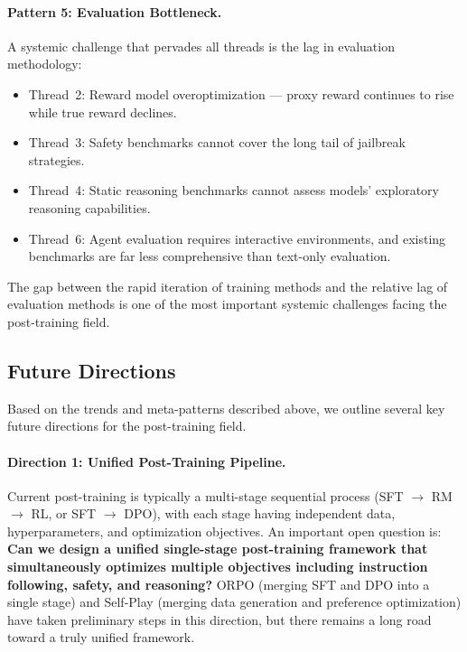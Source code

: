 \paragraph{Pattern 5: Evaluation Bottleneck.}
A systemic challenge that pervades all threads is the lag in evaluation methodology:
\begin{itemize}[leftmargin=2em]
  \item Thread~2: Reward model overoptimization ---
    proxy reward continues to rise while true reward declines.
  \item Thread~3: Safety benchmarks cannot cover the long tail of jailbreak strategies.
  \item Thread~4: Static reasoning benchmarks cannot assess models' exploratory reasoning capabilities.
  \item Thread~6: Agent evaluation requires interactive environments,
    and existing benchmarks are far less comprehensive than text-only evaluation.
\end{itemize}
The gap between the rapid iteration of training methods and the relative lag of evaluation methods
is one of the most important systemic challenges facing the post-training field.

\subsection{Future Directions}
\label{sec:t8-future}

Based on the trends and meta-patterns described above,
we outline several key future directions for the post-training field.

\paragraph{Direction 1: Unified Post-Training Pipeline.}
Current post-training is typically a multi-stage sequential process (SFT $\rightarrow$ RM $\rightarrow$ RL,
or SFT $\rightarrow$ DPO),
with each stage having independent data, hyperparameters, and optimization objectives.
An important open question is:
\textbf{Can we design a unified single-stage post-training framework
that simultaneously optimizes multiple objectives including instruction following, safety, and reasoning?}
ORPO \cite{hong2024orpo} (merging SFT and DPO into a single stage) and
Self-Play \cite{chen2024selfplay} (merging data generation and preference optimization)
have taken preliminary steps in this direction,
but there remains a long road toward a truly unified framework.

